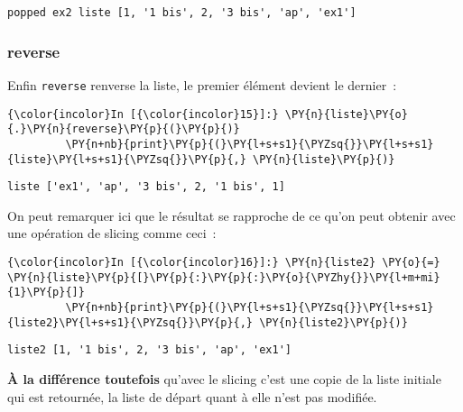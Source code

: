     \begin{Verbatim}[commandchars=\\\{\}]
popped ex2 liste [1, '1 bis', 2, '3 bis', 'ap', 'ex1']

    \end{Verbatim}

    \hypertarget{reverse}{%
\subsubsection{\texorpdfstring{\textbf{reverse}}{reverse}}\label{reverse}}

    Enfin \texttt{reverse} renverse la liste, le premier élément devient le
dernier~:

    \begin{Verbatim}[commandchars=\\\{\}]
{\color{incolor}In [{\color{incolor}15}]:} \PY{n}{liste}\PY{o}{.}\PY{n}{reverse}\PY{p}{(}\PY{p}{)}
         \PY{n+nb}{print}\PY{p}{(}\PY{l+s+s1}{\PYZsq{}}\PY{l+s+s1}{liste}\PY{l+s+s1}{\PYZsq{}}\PY{p}{,} \PY{n}{liste}\PY{p}{)}
\end{Verbatim}


    \begin{Verbatim}[commandchars=\\\{\}]
liste ['ex1', 'ap', '3 bis', 2, '1 bis', 1]

    \end{Verbatim}

    On peut remarquer ici que le résultat se rapproche de ce qu'on peut
obtenir avec une opération de slicing comme ceci~:

    \begin{Verbatim}[commandchars=\\\{\}]
{\color{incolor}In [{\color{incolor}16}]:} \PY{n}{liste2} \PY{o}{=} \PY{n}{liste}\PY{p}{[}\PY{p}{:}\PY{p}{:}\PY{o}{\PYZhy{}}\PY{l+m+mi}{1}\PY{p}{]}
         \PY{n+nb}{print}\PY{p}{(}\PY{l+s+s1}{\PYZsq{}}\PY{l+s+s1}{liste2}\PY{l+s+s1}{\PYZsq{}}\PY{p}{,} \PY{n}{liste2}\PY{p}{)}
\end{Verbatim}


    \begin{Verbatim}[commandchars=\\\{\}]
liste2 [1, '1 bis', 2, '3 bis', 'ap', 'ex1']

    \end{Verbatim}

    \textbf{À la différence toutefois} qu'avec le slicing c'est une copie de
la liste initiale qui est retournée, la liste de départ quant à elle
n'est pas modifiée.

